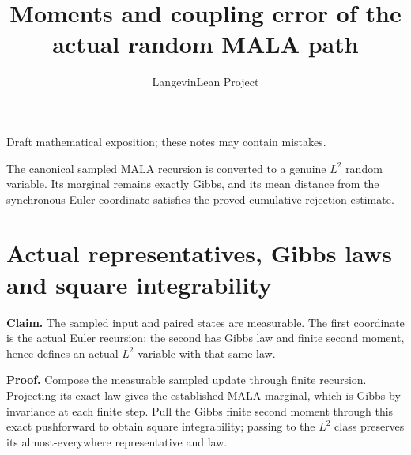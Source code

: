 \documentclass[11pt,a4paper]{article}
\title{\texorpdfstring{Moments and coupling error of the actual random MALA path}{Moments and coupling error of the actual random MALA path}}
\author{LangevinLean Project}
\date{}
\begin{document}
\maketitle
Draft mathematical exposition; these notes may contain mistakes.


The canonical sampled MALA recursion is converted to a genuine \(L^2\) random variable. Its marginal remains exactly Gibbs, and its mean distance from the synchronous Euler coordinate satisfies the proved cumulative rejection estimate.


\section{\texorpdfstring{Actual representatives, Gibbs laws and square integrability}{Actual representatives, Gibbs laws and square integrability}}


\textbf{Claim.} The sampled input and paired states are measurable. The first coordinate is the actual Euler recursion; the second has Gibbs law and finite second moment, hence defines an actual \(L^2\) variable with that same law.



\textbf{Proof.} Compose the measurable sampled update through finite recursion. Projecting its exact law gives the established MALA marginal, which is Gibbs by invariance at each finite step. Pull the Gibbs finite second moment through this exact pushforward to obtain square integrability; passing to the \(L^2\) class preserves its almost-everywhere representative and law.
\end{document}

